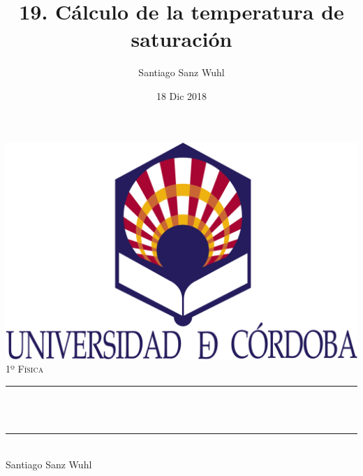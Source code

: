\documentclass[12pt]{article}
\title{19. Cálculo de la temperatura de saturación}								%
\author{Santiago Sanz Wuhl}								%
\date{18 Dic 2018}											%
\makeatletter
\let\thetitle\@title
\makeatother
\begin{document}

\begin{titlepage}
	\centering
    \vspace*{0.5 cm}
    \includegraphics[scale = 0.15]{logo.png}\\[1.0 cm]	%
	\textsc{\Large 1º Física}\\[0.5 cm]				%
	\rule{\linewidth}{0.2 mm} \\[0.4 cm]
	{ \huge \bfseries \thetitle}\\
	\rule{\linewidth}{0.2 mm} \\[1.5 cm]
	 \large Santiago Sanz Wuhl

	
\end{titlepage}


\tableofcontents
\pagebreak

\end{document}
